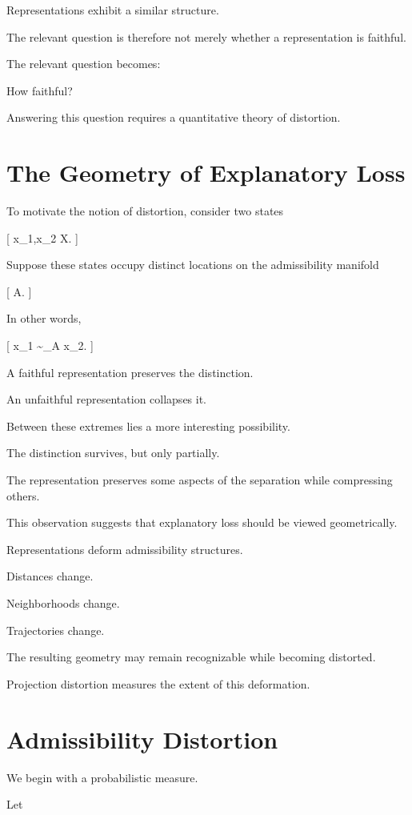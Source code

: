 \documentclass[11pt,oneside,openany]{book}
\begin{document}
Representations exhibit a similar structure.

The relevant question is therefore not merely whether a representation is faithful.

The relevant question becomes:

How faithful?

Answering this question requires a quantitative theory of distortion.

\section{The Geometry of Explanatory Loss}

To motivate the notion of distortion, consider two states

[
x_1,x_2 \in \mathcal X.
]

Suppose these states occupy distinct locations on the admissibility manifold

[
\mathcal A.
]

In other words,

[
x_1 \not\sim_A x_2.
]

A faithful representation preserves the distinction.

An unfaithful representation collapses it.

Between these extremes lies a more interesting possibility.

The distinction survives, but only partially.

The representation preserves some aspects of the separation while compressing others.

This observation suggests that explanatory loss should be viewed geometrically.

Representations deform admissibility structures.

Distances change.

Neighborhoods change.

Trajectories change.

The resulting geometry may remain recognizable while becoming distorted.

Projection distortion measures the extent of this deformation.

\section{Admissibility Distortion}

We begin with a probabilistic measure.

Let
\end{document}

